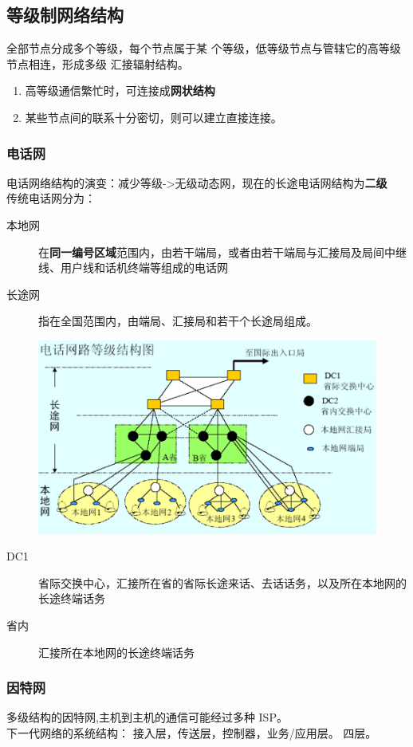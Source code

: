 \subsection{等级制网络结构}
全部节点分成多个等级，每个节点属于某
个等级，低等级节点与管辖它的高等级节点相连，形成多级
汇接辐射结构。
\begin{enumerate}
	\item 高等级通信繁忙时，可连接成\textbf{网状结构}
	\item 某些节点间的联系十分密切，则可以建立直接连接。
\end{enumerate}
\subsubsection{电话网}
电话网络结构的演变：减少等级->无级动态网，现在的长途电话网结构为\textbf{二级}\\
传统电话网分为：
\begin{description}
	\item[本地网] 在\textbf{同一编号区域}范围内，由若干端局，或者由若干端局与汇接局及局间中继线、用户线和话机终端等组成的电话网
	\item[长途网] 指在全国范围内，由端局、汇接局和若干个长途局组成。
\end{description}
\begin{figure}[H]
	\centering
	\includegraphics[width=0.7\linewidth]{figures/screenshot020}
	\caption{}
	\label{fig:screenshot020}
\end{figure}
\begin{description}
	\item[DC1] 省际交换中心，汇接所在省的省际长途来话、去话话务，以及所在本地网的长途终端话务
	\item[省内] 汇接所在本地网的长途终端话务
\end{description}
\subsubsection{因特网}
多级结构的因特网,主机到主机的通信可能经过多种 ISP。\\
下一代网络的系统结构：
接入层，传送层，控制器，业务/应用层。 四层。
